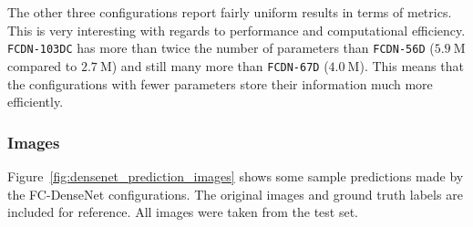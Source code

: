 The other three configurations report fairly uniform results in terms of metrics. This is very interesting with regards to performance and computational efficiency. \texttt{FCDN-103DC} has more than twice the number of parameters than \texttt{FCDN-56D} ($5.9~\text{M}$ compared to $2.7~\text{M}$) and still many more than \texttt{FCDN-67D} ($4.0~\text{M}$). This means that the configurations with fewer parameters store their information much more efficiently.

\subsubsection{Images}
Figure~\ref{fig:densenet_prediction_images} shows some sample predictions made by the FC-DenseNet configurations. The original images and ground truth labels are included for reference. All images were taken from the test set.

